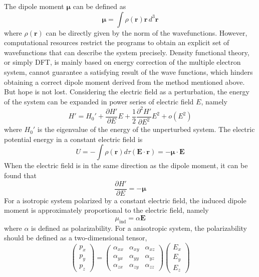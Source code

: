 \documentclass[%
 reprint,
 amsmath,amssymb,
 aps,
10.5pt,
]{revtex4-1}
\begin{document}
The dipole moment $\mathbf{\mu}$ can be defined as
\begin{equation}
  \bm{\mu} = \int \rho(\mathbf{r}) \mathbf{r} \, d^3 \mathbf{r}
 \end{equation} 
 where $\rho(\mathbf{r})$ can be directly given by the norm of the wavefunctions. However, computational resources restrict the programs to obtain an explicit set of wavefunctions that can describe the system precisely. Density functional theory, or simply DFT, is mainly based on energy correction of the multiple electron system, cannot guarantee a satisfying result of the wave functions, which hinders obtaining a correct dipole moment derived from the method mentioned above. But hope is not lost. Considering the electric field as a perturbation, the energy of the system can be expanded in power series of electric field $E$, namely
\begin{equation}
	H' = H_0' + \frac{\partial H'}{\partial E} E + \frac{1}{2} \frac{ \partial^2 H'}{\partial E^2} E^2 + o(E^2)
	\label{expand}
\end{equation}
where $H_0'$ is the eigenvalue of the energy of the unperturbed system. The electric potential energy in a constant electric field is
 \begin{equation}
 	U = - \int \rho(\mathbf{r})d \tau (\mathbf{E} \cdot \mathbf{r}) = - \bm{\mu} \cdot \mathbf{E}
\label{dipolepotential}
 \end{equation}
 When the electric field is in the same direction as the dipole moment, it can be found that 
 \begin{equation}
 	\frac{\partial H'}{\partial E} = - \bm{\mu}
 \end{equation}
 For a isotropic system polarized by a constant electric field, the induced dipole moment is approximately proportional to the electric field, namely
 \begin{equation}
 	\mu_\text{ind} = \alpha \mathbf{E}
 \end{equation}
 where $\alpha$ is defined as polarizability. For a anisotropic system, the polarizability should be defined as a two-dimensional tensor,
 \begin{equation}
  	\begin{pmatrix}
  	p_x \\
  	p_y \\
  	p_z
  	\end{pmatrix} =
  	\begin{pmatrix}
  	\alpha_{xx} & \alpha_{xy} & \alpha_{xz} \\
  	\alpha_{yx} & \alpha_{yy} & \alpha_{yz} \\
  	\alpha_{zx} & \alpha_{zy} & \alpha_{zz}
  	\end{pmatrix}
  	\begin{pmatrix}
  	E_x\\
  	E_y\\
  	E_z
  	\end{pmatrix}
  \end{equation} 
\end{document}
